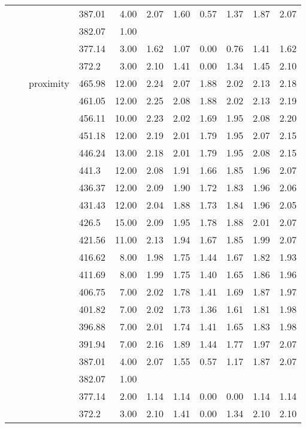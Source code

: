 \begin{longtable}{llllrrrrrrr}
   &  &  & 387.01 & 4.00 & 2.07 & 1.60 & 0.57 & 1.37 & 1.87 & 2.07 \\ 
   &  &  & 382.07 & 1.00 &  &  &  &  &  &  \\ 
   &  &  & 377.14 & 3.00 & 1.62 & 1.07 & 0.00 & 0.76 & 1.41 & 1.62 \\ 
   &  &  & 372.2 & 3.00 & 2.10 & 1.41 & 0.00 & 1.34 & 1.45 & 2.10 \\ 
   &  & proximity & 465.98 & 12.00 & 2.24 & 2.07 & 1.88 & 2.02 & 2.13 & 2.18 \\ 
   &  &  & 461.05 & 12.00 & 2.25 & 2.08 & 1.88 & 2.02 & 2.13 & 2.19 \\ 
   &  &  & 456.11 & 10.00 & 2.23 & 2.02 & 1.69 & 1.95 & 2.08 & 2.20 \\ 
   &  &  & 451.18 & 12.00 & 2.19 & 2.01 & 1.79 & 1.95 & 2.07 & 2.15 \\ 
   &  &  & 446.24 & 13.00 & 2.18 & 2.01 & 1.79 & 1.95 & 2.08 & 2.15 \\ 
   &  &  & 441.3 & 12.00 & 2.08 & 1.91 & 1.66 & 1.85 & 1.96 & 2.07 \\ 
   &  &  & 436.37 & 12.00 & 2.09 & 1.90 & 1.72 & 1.83 & 1.96 & 2.06 \\ 
   &  &  & 431.43 & 12.00 & 2.04 & 1.88 & 1.73 & 1.84 & 1.96 & 2.05 \\ 
   &  &  & 426.5 & 15.00 & 2.09 & 1.95 & 1.78 & 1.88 & 2.01 & 2.07 \\ 
   &  &  & 421.56 & 11.00 & 2.13 & 1.94 & 1.67 & 1.85 & 1.99 & 2.07 \\ 
   &  &  & 416.62 & 8.00 & 1.98 & 1.75 & 1.44 & 1.67 & 1.82 & 1.93 \\ 
   &  &  & 411.69 & 8.00 & 1.99 & 1.75 & 1.40 & 1.65 & 1.86 & 1.96 \\ 
   &  &  & 406.75 & 7.00 & 2.02 & 1.78 & 1.41 & 1.69 & 1.87 & 1.97 \\ 
   &  &  & 401.82 & 7.00 & 2.02 & 1.73 & 1.36 & 1.61 & 1.81 & 1.98 \\ 
   &  &  & 396.88 & 7.00 & 2.01 & 1.74 & 1.41 & 1.65 & 1.83 & 1.98 \\ 
   &  &  & 391.94 & 7.00 & 2.16 & 1.89 & 1.44 & 1.77 & 1.97 & 2.07 \\ 
   &  &  & 387.01 & 4.00 & 2.07 & 1.55 & 0.57 & 1.17 & 1.87 & 2.07 \\ 
   &  &  & 382.07 & 1.00 &  &  &  &  &  &  \\ 
   &  &  & 377.14 & 2.00 & 1.14 & 1.14 & 0.00 & 0.00 & 1.14 & 1.14 \\ 
   &  &  & 372.2 & 3.00 & 2.10 & 1.41 & 0.00 & 1.34 & 2.10 & 2.10 \\ 

\end{longtable}
